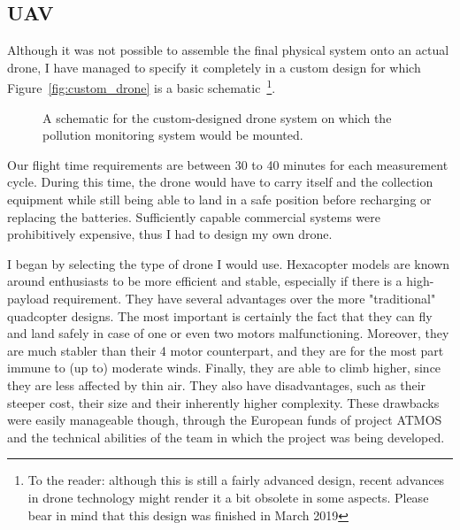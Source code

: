 \subsection{\acrlong{UAV}}%
\label{sub:methods_uav}

Although it was not possible to assemble the final physical system onto
an actual drone, I have managed to specify it completely in a custom
design for which Figure~\ref{fig:custom_drone} is a basic
schematic~\footnote{To the reader: although this is still a fairly
advanced design, recent advances in drone technology might render it
a bit obsolete in some aspects. Please bear in mind that this design
was finished in March 2019}.

\begin{figure}[htpb]
    \centering
    \missingfigure{}
    \caption{A schematic for the custom-designed drone system on which
    the pollution monitoring system would be mounted.}%
    \label{fig:img/pdf/drone_schematic}
\end{figure}

Our flight time requirements are between 30 to 40 minutes for each
measurement cycle. During this time, the drone would have to carry
itself and the collection equipment while still being able to land in a
safe position before recharging or replacing the batteries. Sufficiently
capable commercial systems were prohibitively expensive, thus I had to
design my own drone.

I began by selecting the type of drone I would use. Hexacopter models
are known around enthusiasts to be more efficient and stable, especially
if there is a high-payload requirement. They have several advantages
over the more "traditional" quadcopter designs. The most important is
certainly the fact that they can fly and land safely in case of one or
even two motors malfunctioning. Moreover, they are much stabler than
their 4 motor counterpart, and they are for the most part immune to (up
to) moderate winds. Finally, they are able to climb higher, since they
are less affected by thin air. They also have disadvantages, such as
their steeper cost, their size and their inherently higher complexity.
These drawbacks were easily manageable though, through the European
funds of project \gls{ATMOS} and the technical abilities of the team in
which the project was being developed.

